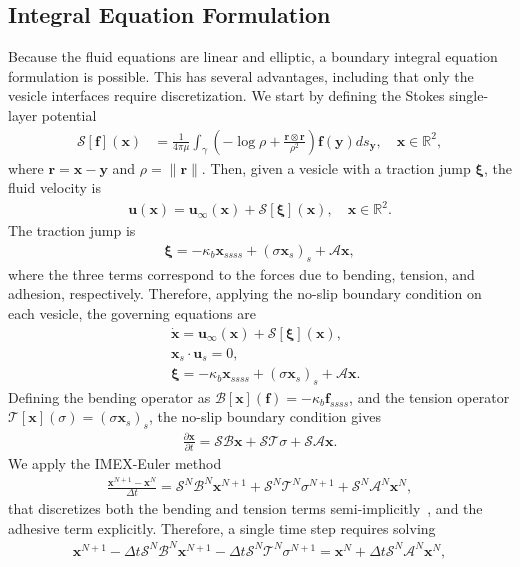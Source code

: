 \documentclass[prf,superscriptaddress,showpacs]{revtex4-1}
\renewcommand{\AA}{\mathcal{A}}
\newcommand{\BB}{\mathcal{B}}
\newcommand{\ff}{\mathbf{f}}
\newcommand{\pderiv}[2]{\frac{\partial #1}{\partial #2}}
\newcommand{\rr}{\mathbf{r}}
\newcommand{\RR}{\mathbb{R}}
\renewcommand{\SS}{\mathcal{S}}
\newcommand{\TT}{\mathcal{T}}
\newcommand{\uu}{\mathbf{u}}
\newcommand{\xx}{\mathbf{x}}
\newcommand{\xxi}{\boldsymbol{\xi}}
\newcommand{\yy}{\mathbf{y}}
\begin{document}
\subsection{Integral Equation Formulation}
Because the fluid equations are linear and elliptic, a boundary integral
equation formulation is possible.  This has several advantages,
including that only the vesicle interfaces require discretization.  We
start by defining the Stokes single-layer potential
\begin{align}
  \SS[\ff](\xx) &= \frac{1}{4\pi\mu} \int_\gamma \left(
    -\log \rho + \frac{\rr \otimes \rr}{\rho^2} \right) 
    \ff(\yy) ds_\yy, \quad \xx \in \RR^2,
  \label{eqn:SLP}
\end{align}
where $\rr = \xx - \yy$ and $\rho = \|\rr\|$.  Then, given a vesicle
with a traction jump $\xxi$, the fluid velocity is~\cite{poz1992}
\begin{align*}
  \uu(\xx) = \uu_{\infty}(\xx) + \SS[\xxi](\xx), \quad \xx \in \RR^2.
\end{align*}
The traction jump is
\begin{align*}
  \xxi = -\kappa_b \xx_{ssss} + (\sigma \xx_s)_s + \AA \xx,
\end{align*}
where the three terms correspond to the forces due to bending, tension,
and adhesion, respectively.  Therefore, applying the no-slip boundary
condition on each vesicle, the governing equations are
\begin{align*}
  &\dot{\xx} = \uu_{\infty}(\xx) + \SS[\xxi](\xx), \\
  &\xx_s \cdot \uu_s = 0, \\
  &\xxi = -\kappa_b \xx_{ssss} + (\sigma \xx_s)_s + \AA\xx.
\end{align*}
Defining the bending operator as $\BB[\xx](\ff) = -\kappa_b \ff_{ssss}$,
and the tension operator $\TT[\xx](\sigma) = (\sigma \xx_s)_s$, the
no-slip boundary condition gives
\begin{align*}
  \pderiv{\xx}{t} = \SS \BB \xx + \SS \TT \sigma + \SS \AA \xx.
\end{align*}
We apply the IMEX-Euler method 
\begin{align*}
  \frac{\xx^{N+1} - \xx^N}{\Delta t} = \SS^N \BB^N \xx^{N+1} + 
  \SS^N \TT^N \sigma^{N+1} + \SS^N \AA^N \xx^N,
\end{align*}
that discretizes both the bending and tension terms
semi-implicitly~\cite{qua-bir2014}, and the adhesive term explicitly.
Therefore, a single time step requires solving
\begin{align*}
  \xx^{N+1} - \Delta t \SS^N \BB^N \xx^{N+1} - 
    \Delta t \SS^N \TT^N \sigma^{N+1} = \xx^N + 
    \Delta t \SS^N \AA^N \xx^N,
\end{align*}
\end{document}
